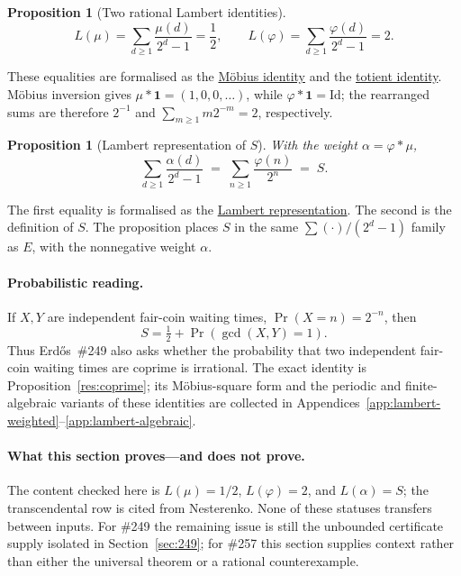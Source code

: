 \documentclass[11pt]{article}
\newcommand{\commit}{bb4e24651b37cd096d3749ef299c3317930b3a3b}
\newcommand{\repobase}{https://github.com/wcook04/plectis-lean-erdos249-257/blob/\commit}
\newcommand{\PK}{Erdos249257}
\newcommand{\lword}[4]{\href{\repobase/\PK/#1\#L#2}{#4}}
\newtheorem{proposition}[theorem]{Proposition}
\theoremstyle{definition}
\theoremstyle{remark}
\newcommand{\ph}{\varphi}
\begin{document}
\begin{proposition}[Two rational Lambert identities]
\[
 L(\mu)=\sum_{d\ge1}\frac{\mu(d)}{2^d-1}=\frac12,
 \qquad
 L(\ph)=\sum_{d\ge1}\frac{\ph(d)}{2^d-1}=2.
\]
\end{proposition}
\noindent These equalities are formalised as the
\lword{MersenneLambertLadder.lean}{587}{tsum_moebius_div_two_pow_sub_one_eq_half}{M\"obius identity}
and the
\lword{MersenneLambertLadder.lean}{575}{tsum_totient_div_two_pow_sub_one_eq_two}{totient identity}.
M\"obius inversion gives \(\mu*\mathbf 1=(1,0,0,\ldots)\), while
\(\ph*\mathbf 1=\mathrm{Id}\); the rearranged sums are therefore
\(2^{-1}\) and \(\sum_{m\geq1}m2^{-m}=2\), respectively.

\begin{proposition}[Lambert representation of \(S\)]\label{res:lift}
With the weight $\alpha=\ph*\mu$,
\[
\sum_{d\ge1}\frac{\alpha(d)}{2^d-1}\;=\;\sum_{n\ge1}\frac{\ph(n)}{2^n}\;=\;S.
\]
\end{proposition}
\noindent The first equality is formalised as the
\lword{CertificateKernel.lean}{18445}{tsum_primWeight_div_two_pow_sub_one_eq_totient_series}{Lambert representation}.
The second is the definition of \(S\).  The proposition places \(S\) in the
same \(\sum(\cdot)/(2^d-1)\) family as \(E\), with the nonnegative weight
\(\alpha\).

\paragraph{Probabilistic reading.}
If \(X,Y\) are independent fair-coin waiting times,
\(\Pr(X=n)=2^{-n}\), then
\[
 S=\tfrac12+\Pr(\gcd(X,Y)=1).
\]
Thus Erd\H{o}s~\#249 also asks whether the probability that two independent
fair-coin waiting times are coprime is irrational.  The exact identity is
Proposition~\ref{res:coprime}; its M\"obius-square form and the periodic and
finite-algebraic variants of these identities are collected in
Appendices~\ref{app:lambert-weighted}--\ref{app:lambert-algebraic}.

\paragraph{What this section proves---and does not prove.}
The content checked here is
\(L(\mu)=1/2\), \(L(\ph)=2\), and \(L(\alpha)=S\); the transcendental row is
cited from Nesterenko.  None of these statuses transfers between inputs.  For
\#249 the remaining issue is still the unbounded certificate supply isolated
in Section~\ref{sec:249}; for \#257 this section supplies context rather than
either the universal theorem or a rational counterexample.
\end{document}
